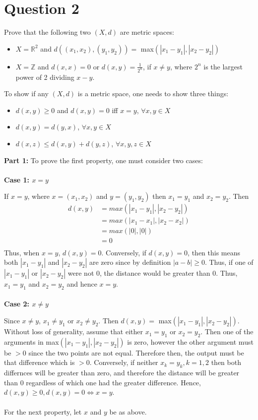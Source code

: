 \documentclass[12pt, letterpaper]{article}
\begin{document}
\section*{Question 2}
Prove that the following two $(X, d)$ are metric spaces:
\begin{itemize}
    \item $X = \mathbb{R}^2$ and $d((x_1, x_2), (y_1, y_2)) =$ max$(|x_1 - y_1|, |x_2 - y_2|)$
    \item $X = \mathbb{Z}$ and $d(x, x) = 0$ or $d(x, y) = \frac{1}{2^n}$, if $x \neq y$, where $2^n$ is the largest power of 2 dividing $x - y$.
\end{itemize}
To show if any $(X, d)$ is a metric space, one needs to show three things:
\begin{itemize}
    \item $d(x, y) \geq 0$ and $d(x, y) = 0$ iff $x = y$, $\forall x, y \in X$
    \item $d(x, y) = d(y, x)$, $\forall x, y \in X$
    \item $d(x, z) \leq d(x, y) + d(y, z)$, $\forall x, y, z \in X$
\end{itemize}
\textbf{Part 1:}
To prove the first property, one must consider two cases:\\
\\
\noindent\textbf{Case 1: $x = y$}

\noindent If $x = y$, where $x = (x_1, x_2)$ and $y = (y_1, y_2)$ then $x_1 = y_1$ and $x_2 = y_2$. Then
\begin{align*}
  d(x, y) &=  max(|x_1 - y_1|, |x_2 - y_2|)\\
  &= max(|x_1 - x_1|, |x_2 - x_2|)\\
  &= max(|0|, |0|)\\
  &= 0\\
\end{align*}
Thus, when $x = y$, $d(x, y) = 0$. Conversely, if $d(x, y) = 0$, then this means both $|x_1 - y_1|$ and $|x_2 - y_2|$
are zero since by definition $|a - b| \geq 0$. Thus, if one of  $|x_1 - y_1|$ or $|x_2 - y_2|$ were not 0, the distance would be greater than 0. Thus, $x_1 = y_1$ and $x_2 = y_2$
and hence $x = y$.\\
\\
\noindent\textbf{Case 2: $x \neq y$}

\noindent Since $x \neq y$, $x_1 \neq y_1$ or $x_2 \neq y_2$. Then $d(x, y) = $ max$(|x_1 - y_1|, |x_2 - y_2|)$. Without loss of generality, assume that either $x_1 = y_1$ or $x_2 = y_2$.
Then one of the arguments in max$(|x_1 - y_1|, |x_2 - y_2|)$ is zero, however the other argument must be $> 0$ since the two points are not equal. Therefore then, the output must be that difference which is $> 0$.
Conversely, if neither $x_k = y_k, k = 1, 2$ then both differnces will be greater than zero, and therefore the distance will be greater than 0 regardless of which one had the greater difference.
Hence, $d(x, y) \geq 0, d(x, y) = 0 \iff x = y$.\\
\\
For the next property, let $x$ and $y$ be as above.\\
\end{document}
